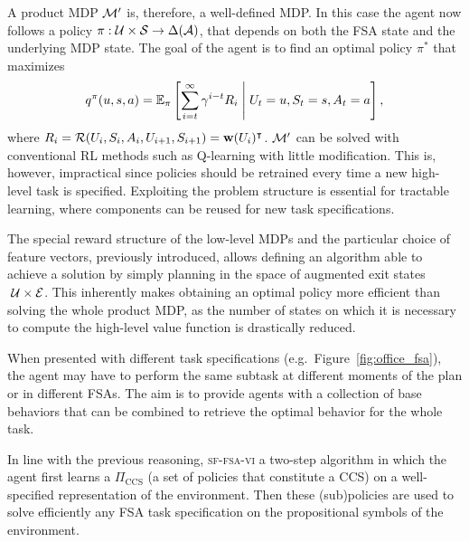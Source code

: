 


A product MDP $\mathcal{M}'$ is, therefore, a well-defined MDP. In this case the agent now follows a policy $\pi:\mathcal{U}\times\mathcal{S}\rightarrow\Delta(\mathcal{A})$, that depends on both the FSA state and the underlying MDP state. The goal of the agent is to find an optimal policy $\pi^*$ that maximizes
\begin{equation}
q^\pi(u, s, a) = \mathbb{E}_{\pi}\left[\sum_{i=t}^\infty \gamma^{i-t}R_i\;\middle\lvert\;U_t= u, S_t=s, A_t=a\right],
\label{eq:sf_fsa_qfunction}
\end{equation}
where $R_i=\mathcal{R}(U_i, S_i, A_i, U_{i+1}, S_{i+1})=\mathbf{w}(U_i)^\intercal $. $\mathcal{M}'$ can be solved with conventional RL methods such as Q-learning with little modification. This is, however, impractical since policies should be retrained every time a new high-level task is specified. Exploiting the problem structure is essential for tractable learning, where components can be reused for new task specifications. 

The special reward structure of the low-level MDPs and the particular choice of feature vectors, previously introduced, allows defining an algorithm able to achieve a solution by simply planning in the space of augmented exit states $\;\mathcal{U}\times\mathcal{E}$. This inherently makes obtaining an optimal policy more efficient than solving the whole product MDP, as the number of states on which it is necessary to compute the high-level value function is drastically reduced.

When presented with different task specifications (e.g.~Figure~\ref{fig:office_fsa}), the agent may have to perform the same subtask at different moments of the plan or in different FSAs. The aim is to provide agents with a collection of base behaviors that can be combined to retrieve the optimal behavior for the whole task.

In line with the previous reasoning, \textsc{sf-fsa-vi} a two-step algorithm in which the agent first learns a $\Pi_{\text{CCS}}$ (a set of policies that constitute a CCS) on a well-specified representation of the environment. Then these (sub)policies are used to solve efficiently any FSA task specification on the propositional symbols of the environment. 

